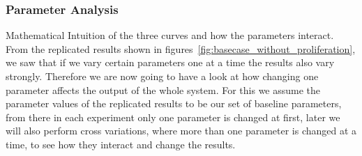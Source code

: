 \subsubsection{Parameter Analysis}

Mathematical Intuition of the three curves and how the parameters interact.\newline 
From the replicated results shown in figures~\ref{fig:basecase_without_proliferation}, we saw that if we vary certain parameters one at a time the results also vary strongly. Therefore we are now going to have a look at how changing one parameter affects the output of the whole system. For this we assume the parameter values of the replicated results to be our set of baseline parameters, from there in each experiment only one parameter is changed at first, later we will also perform cross variations, where more than one parameter is changed at a time, to see how they interact and change the results. 

